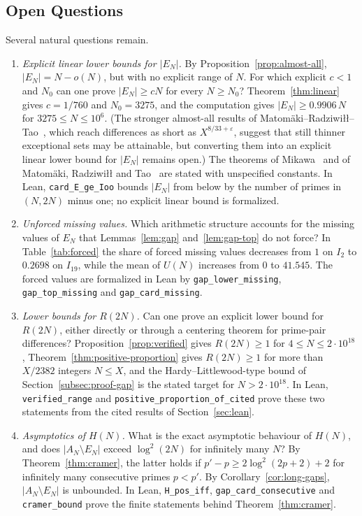 \documentclass[11pt]{amsart}
\theoremstyle{definition}
\theoremstyle{remark}
\begin{document}
\subsection*{Open Questions}
Several natural questions remain.
\begin{enumerate}
\item[\emph{(1)}] \emph{Explicit linear lower bounds for $|E_N|$.} By Proposition~\ref{prop:almost-all}, $|E_N|=N-o(N)$, but with no explicit range of $N$. For which explicit $c<1$ and $N_0$ can one prove $|E_N|\geq cN$ for every $N\geq N_0$? Theorem~\ref{thm:linear} gives $c=1/760$ and $N_0=3275$, and the computation gives $|E_N|\geq 0.9906\,N$ for $3275\leq N\leq 10^6$. (The stronger almost-all results of Matom\"aki--Radziwi{\l}{\l}--Tao~\cite{matomaki2019correlations}, which reach differences as short as $X^{8/33+\varepsilon}$, suggest that still thinner exceptional sets may be attainable, but converting them into an explicit linear lower bound for $|E_N|$ remains open.) The theorems of Mikawa~\cite{mikawa1991prime} and of Matom\"aki, Radziwi{\l}{\l} and Tao~\cite{matomaki2019correlations} are stated with unspecified constants. In Lean, \texttt{card\_E\_ge\_Ioo} bounds $|E_N|$ from below by the number of primes in $(N,2N)$ minus one; no explicit linear bound is formalized.
\item[\emph{(2)}] \emph{Unforced missing values.} Which arithmetic structure accounts for the missing values of $E_N$ that Lemmas~\ref{lem:gap} and~\ref{lem:gap-top} do not force? In Table~\ref{tab:forced} the share of forced missing values decreases from $1$ on $I_2$ to $0.2698$ on $I_{19}$, while the mean of $U(N)$ increases from $0$ to $41.545$. The forced values are formalized in Lean by \texttt{gap\_lower\_missing}, \texttt{gap\_top\_missing} and \texttt{gap\_card\_missing}.
\item[\emph{(3)}] \emph{Lower bounds for $R(2N)$.} Can one prove an explicit lower bound for $R(2N)$, either directly or through a centering theorem for prime-pair differences? Proposition~\ref{prop:verified} gives $R(2N)\geq 1$ for $4\leq N\leq 2\cdot 10^{18}$, Theorem~\ref{thm:positive-proportion} gives $R(2N)\geq 1$ for more than $X/2382$ integers $N\leq X$, and the Hardy--Littlewood-type bound of Section~\ref{subsec:proof-gap} is the stated target for $N>2\cdot 10^{18}$. In Lean, \texttt{verified\_range} and \texttt{positive\_proportion\_of\_cited} prove these two statements from the cited results of Section~\ref{sec:lean}.
\item[\emph{(4)}] \emph{Asymptotics of $H(N)$.} What is the exact asymptotic behaviour of $H(N)$, and does $|A_N\setminus E_N|$ exceed $\log^2(2N)$ for infinitely many $N$? By Theorem~\ref{thm:cramer}, the latter holds if $p'-p\geq 2\log^2(2p+2)+2$ for infinitely many consecutive primes $p<p'$. By Corollary~\ref{cor:long-gaps}, $|A_N\setminus E_N|$ is unbounded. In Lean, \texttt{H\_pos\_iff}, \texttt{gap\_card\_consecutive} and \texttt{cramer\_bound} prove the finite statements behind Theorem~\ref{thm:cramer}.

\end{enumerate}
\end{document}
